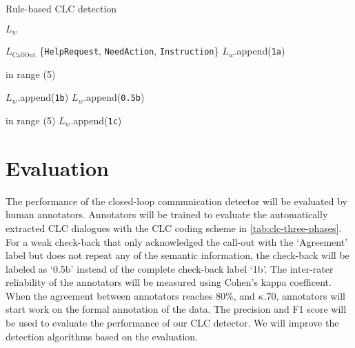 \begin{algorithm}
    \caption{Rule-based CLC detection}\label{alg:CLC}
    \begin{algorithmic}[1]
        \State $L_w$ \gets []

        \State $L_\text{CallOut}$ \gets \{\texttt{HelpRequest}, \texttt{NeedAction}, \texttt{Instruction}\}
          
                \State $L_w$.append(\texttt{1a})
            \EndIf
        \EndFunction

         in range (5)

                \State $L_w$.append(\texttt{1b})
                \EndIf
            \Else
                \State $L_w$.append(\texttt{0.5b})
            \EndIf
        \EndFunction

         in range (5)
                \State $L_w$.append(\texttt{1c})
            \EndIf
        \EndFunction
    \end{algorithmic}
\end{algorithm}

\section{Evaluation}

The performance of the closed-loop communication detector will be evaluated by
human annotators. Annotators will be trained to evaluate the automatically
extracted CLC dialogues with the CLC coding scheme in
\autoref{tab:clc-three-phases}. For a weak check-back that only acknowledged
the call-out with the ‘Agreement’ label but does not repeat any of the semantic
information, the check-back will be labeled as ‘0.5b’ instead of the complete
check-back label `1b'.  The inter-rater reliability of the annotators will be
measured using Cohen’s kappa coefficent. When the agreement between annotators
reaches 80\%, and $\kappa.70$, annotators will start work on the formal
annotation of the data. The precision and F1 score will be used to evaluate the
performance of our CLC detector. We will improve the detection algorithms based
on the evaluation. 

